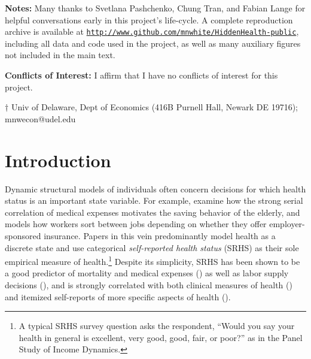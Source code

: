 \documentclass[12pt,pdftex,letterpaper]{article}
\begin{document}
\vspace{0.5cm}
\begin{singlespace}
	\noindent \textbf{Notes:} Many thanks to Svetlana Pashchenko, Chung Tran, and Fabian Lange for helpful conversations early in this project's life-cycle.  A complete reproduction archive is available at \href{http://www.github.com/mnwhite/HiddenHealth-public}{\texttt{http://www.github.com/mnwhite/HiddenHealth-public}}, including all data and code used in the project, as well as many auxiliary figures not included in the main text.
	
	\vspace{0.5cm}
	
	\noindent \textbf{Conflicts of Interest:} I affirm that I have no conflicts of interest for this project.
	
	\vspace{1cm}
	
	\small
	\noindent $\dagger$ Univ of Delaware, Dept of Economics (416B Purnell Hall, Newark DE 19716);  mnwecon@udel.edu
\end{singlespace}


\thispagestyle{empty}

\newpage


\newlength{\TableWidth}

\section{Introduction}\label{sec:Intro}

Dynamic structural models of individuals often concern decisions for which health status is an important state variable.  For example, \cite{DeNardi10} examine how the strong serial correlation of medical expenses motivates the saving behavior of the elderly, and \cite{Aizawa19} models how workers sort between jobs depending on whether they offer employer-sponsored insurance.  Papers in this vein predominantly model health as a discrete state and use categorical \textit{self-reported health status} (SRHS) as their sole empirical measure of health.\footnote{A typical SRHS survey question asks the respondent, ``Would you say your health in general is excellent, very good, good, fair, or poor?'' as in the Panel Study of Income Dynamics.}  Despite its simplicity, SRHS has been shown to be a good predictor of mortality and medical expenses (\cite{Idler97}) as well as labor supply decisions (\cite{Bound91}), and is strongly correlated with both clinical measures of health (\cite{LaRue79}) and itemized self-reports of more specific aspects of health (\cite{Blundell17}).
\end{document}

